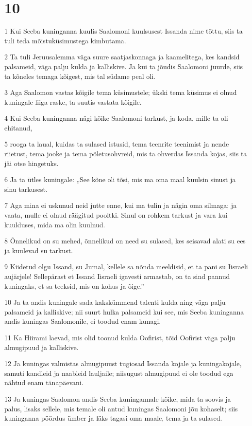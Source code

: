 \chapter{10}

\par 1 Kui Seeba kuninganna kuulis Saalomoni kuulsusest Issanda nime tõttu, siis ta tuli teda mõistuküsimustega kimbutama.
\par 2 Ta tuli Jeruusalemma väga suure saatjaskonnaga ja kaamelitega, kes kandsid palsameid, väga palju kulda ja kalliskive. Ja kui ta jõudis Saalomoni juurde, siis ta kõneles temaga kõigest, mis tal südame peal oli.
\par 3 Aga Saalomon vastas kõigile tema küsimustele; ükski tema küsimus ei olnud kuningale liiga raske, ta suutis vastata kõigile.
\par 4 Kui Seeba kuninganna nägi kõike Saalomoni tarkust, ja koda, mille ta oli ehitanud,
\par 5 rooga ta laual, kuidas ta sulased istusid, tema teenrite teenimist ja nende riietust, tema jooke ja tema põletusohvreid, mis ta ohverdas Issanda kojas, siis ta jäi otse hingetuks.
\par 6 Ja ta ütles kuningale: „See kõne oli tõsi, mis ma oma maal kuulsin sinust ja sinu tarkusest.
\par 7 Aga mina ei uskunud neid jutte enne, kui ma tulin ja nägin oma silmaga; ja vaata, mulle ei olnud räägitud pooltki. Sinul on rohkem tarkust ja vara kui kuulduses, mida ma olin kuulnud.
\par 8 Õnnelikud on su mehed, õnnelikud on need su sulased, kes seisavad alati su ees ja kuulevad su tarkust.
\par 9 Kiidetud olgu Issand, su Jumal, kellele sa nõnda meeldisid, et ta pani su Iisraeli aujärjele! Sellepärast et Issand Iisraeli igavesti armastab, on ta sind pannud kuningaks, et sa teeksid, mis on kohus ja õige.”
\par 10 Ja ta andis kuningale sada kakskümmend talenti kulda ning väga palju palsameid ja kalliskive; nii suurt hulka palsameid kui see, mis Seeba kuninganna andis kuningas Saalomonile, ei toodud enam kunagi.
\par 11 Ka Hiirami laevad, mis olid toonud kulda Oofirist, tõid Oofirist väga palju almugipuud ja kalliskive.
\par 12 Ja kuningas valmistas almugipuust tugiosad Issanda kojale ja kuningakojale, samuti kandleid ja naableid lauljaile; niisugust almugipuud ei ole toodud ega nähtud enam tänapäevani.
\par 13 Ja kuningas Saalomon andis Seeba kuningannale kõike, mida ta soovis ja palus, lisaks sellele, mis temale oli antud kuningas Saalomoni jõu kohaselt; siis kuninganna pöördus ümber ja läks tagasi oma maale, tema ja ta sulased.
